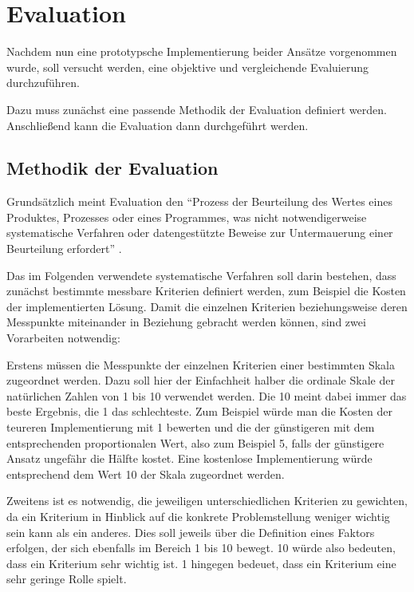 \section{Evaluation}

Nachdem nun eine prototypsche Implementierung beider Ansätze vorgenommen wurde, soll versucht werden, eine objektive und vergleichende Evaluierung durchzuführen.

Dazu muss zunächst eine passende Methodik der Evaluation definiert werden. Anschließend kann die Evaluation dann durchgeführt werden.

\subsection{Methodik der Evaluation}

Grundsätzlich meint Evaluation den "`Prozess der Beurteilung des Wertes eines Produktes, Prozesses oder eines Programmes, was nicht notwendigerweise systematische Verfahren oder datengestützte Beweise zur Untermauerung einer Beurteilung erfordert"' \citep[S.][S. 9]{evaluationorig}.

Das im Folgenden verwendete systematische Verfahren soll darin bestehen, dass zunächst bestimmte messbare Kriterien definiert werden, zum Beispiel die Kosten der implementierten Lösung. Damit die einzelnen Kriterien beziehungsweise deren Messpunkte miteinander in Beziehung gebracht werden können, sind zwei Vorarbeiten notwendig:

Erstens müssen die Messpunkte der einzelnen Kriterien einer bestimmten Skala zugeordnet werden. Dazu soll hier der Einfachheit halber die ordinale Skale der natürlichen Zahlen von 1 bis 10 verwendet werden. Die 10 meint dabei immer das beste Ergebnis, die 1 das schlechteste. Zum Beispiel würde man die Kosten der teureren Implementierung mit 1 bewerten und die der günstigeren mit dem entsprechenden proportionalen Wert, also zum Beispiel 5, falls der günstigere Ansatz ungefähr die Hälfte kostet. Eine kostenlose Implementierung würde entsprechend dem Wert 10 der Skala zugeordnet werden.

Zweitens ist es notwendig, die jeweiligen unterschiedlichen Kriterien zu gewichten, da ein Kriterium in Hinblick auf die konkrete Problemstellung weniger wichtig sein kann als ein anderes. Dies soll jeweils über die Definition eines Faktors erfolgen, der sich ebenfalls im Bereich 1 bis 10 bewegt. 10 würde also bedeuten, dass ein Kriterium sehr wichtig ist. 1 hingegen bedeuet, dass ein Kriterium eine sehr geringe Rolle spielt.

